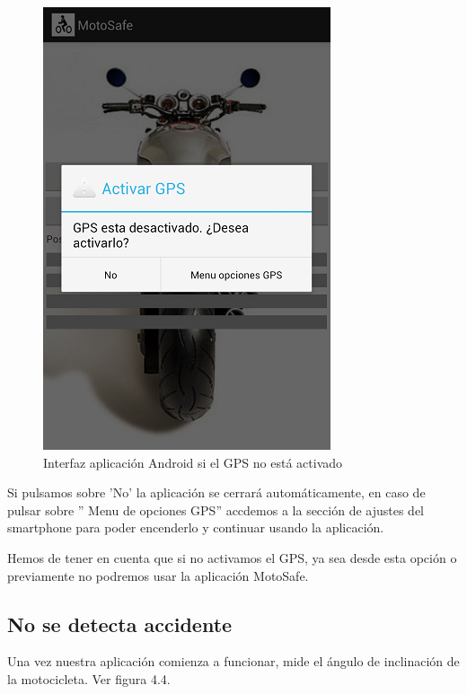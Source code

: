 			\begin{figure}[h]
				\centering
				\includegraphics{imagenes/GPSOff.png}
				\caption{Interfaz aplicación Android si el GPS no está activado}
				\label{contexto:figura}
			\end{figure}
			
			Si pulsamos sobre 'No' la aplicación se cerrará automáticamente, en caso de pulsar sobre '' Menu de opciones GPS'' accdemos a la sección de ajustes del smartphone para poder encenderlo y continuar usando la aplicación.
			
			Hemos de tener en cuenta que si no activamos el GPS, ya sea desde esta opción o previamente no podremos usar la aplicación MotoSafe.
		
		\subsection{No se detecta accidente}
		
		Una vez nuestra aplicación comienza a funcionar, mide el ángulo de inclinación de la motocicleta. Ver figura 4.4.
		
